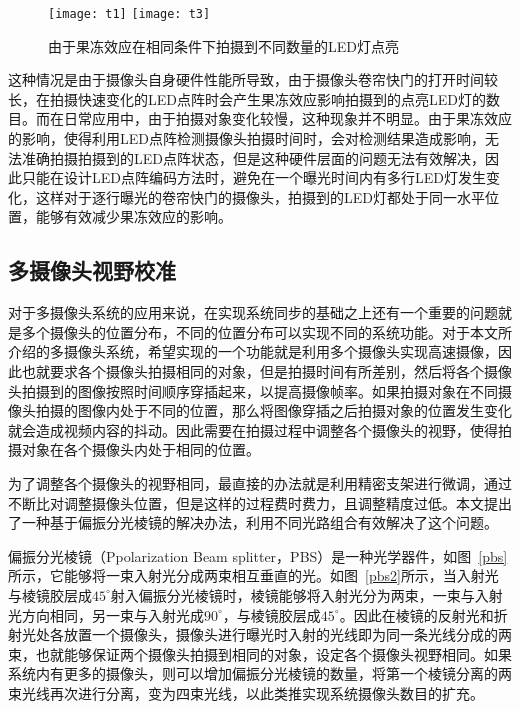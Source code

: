 \begin{figure}[h]
  \centering%
    {\texttt{[image: t1]}}
      {\texttt{[image: t3]}}
  \caption{由于果冻效应在相同条件下拍摄到不同数量的LED灯点亮}
  \label{t}
\end{figure}

这种情况是由于摄像头自身硬件性能所导致，由于摄像头卷帘快门的打开时间较长，在拍摄快速变化的LED点阵时会产生果冻效应影响拍摄到的点亮LED灯的数目。而在日常应用中，由于拍摄对象变化较慢，这种现象并不明显。由于果冻效应的影响，使得利用LED点阵检测摄像头拍摄时间时，会对检测结果造成影响，无法准确拍摄拍摄到的LED点阵状态，但是这种硬件层面的问题无法有效解决，因此只能在设计LED点阵编码方法时，避免在一个曝光时间内有多行LED灯发生变化，这样对于逐行曝光的卷帘快门的摄像头，拍摄到的LED灯都处于同一水平位置，能够有效减少果冻效应的影响。

\subsection{多摄像头视野校准}

对于多摄像头系统的应用来说，在实现系统同步的基础之上还有一个重要的问题就是多个摄像头的位置分布，不同的位置分布可以实现不同的系统功能。对于本文所介绍的多摄像头系统，希望实现的一个功能就是利用多个摄像头实现高速摄像，因此也就要求各个摄像头拍摄相同的对象，但是拍摄时间有所差别，然后将各个摄像头拍摄到的图像按照时间顺序穿插起来，以提高摄像帧率。如果拍摄对象在不同摄像头拍摄的图像内处于不同的位置，那么将图像穿插之后拍摄对象的位置发生变化就会造成视频内容的抖动。因此需要在拍摄过程中调整各个摄像头的视野，使得拍摄对象在各个摄像头内处于相同的位置。

为了调整各个摄像头的视野相同，最直接的办法就是利用精密支架进行微调，通过不断比对调整摄像头位置，但是这样的过程费时费力，且调整精度过低。本文提出了一种基于偏振分光棱镜的解决办法，利用不同光路组合有效解决了这个问题。

偏振分光棱镜（Ppolarization Beam splitter，PBS）是一种光学器件，如图~\ref{pbs}所示，它能够将一束入射光分成两束相互垂直的光。如图~\ref{pbs2}所示，当入射光与棱镜胶层成$45^{\circ}$射入偏振分光棱镜时，棱镜能够将入射光分为两束，一束与入射光方向相同，另一束与入射光成$90^{\circ}$，与棱镜胶层成$45^{\circ}$。因此在棱镜的反射光和折射光处各放置一个摄像头，摄像头进行曝光时入射的光线即为同一条光线分成的两束，也就能够保证两个摄像头拍摄到相同的对象，设定各个摄像头视野相同。如果系统内有更多的摄像头，则可以增加偏振分光棱镜的数量，将第一个棱镜分离的两束光线再次进行分离，变为四束光线，以此类推实现系统摄像头数目的扩充。

